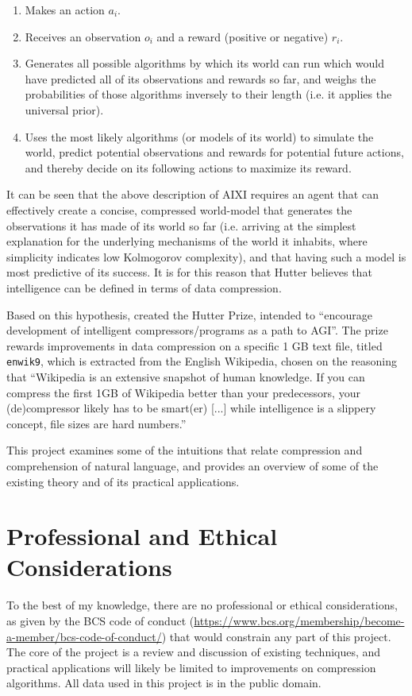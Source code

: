 \begin{enumerate}
    \item Makes an action $a_i$.
    \item Receives an observation $o_i$ and a reward (positive or negative) $r_i$.
    \item Generates all possible algorithms by which its world can run which would have predicted all of its observations and rewards so far, and weighs the probabilities of those algorithms inversely to their length (i.e. it applies the universal prior).
    \item Uses the most likely algorithms (or models of its world) to simulate the world, predict potential observations and rewards for potential future actions, and thereby decide on its following actions to maximize its reward.
\end{enumerate}

It can be seen that the above description of AIXI requires an agent that can effectively create a concise, compressed world-model that generates the observations it has made of its world so far (i.e. arriving at the simplest explanation for the underlying mechanisms of the world it inhabits, where simplicity indicates low Kolmogorov complexity), and that having such a model is most predictive of its success. It is for this reason that Hutter believes that intelligence can be defined in terms of data compression.

Based on this hypothesis, \textcite{Hutter2006} created the Hutter Prize, intended to “encourage development of intelligent compressors/programs as a path to AGI”. The prize rewards improvements in data compression on a specific 1 GB text file, titled \texttt{enwik9}, which is extracted from the English Wikipedia, chosen on the reasoning that “Wikipedia is an extensive snapshot of human knowledge. If you can compress the first 1GB of Wikipedia better than your predecessors, your (de)compressor likely has to be smart(er) [...] while intelligence is a slippery concept, file sizes are hard numbers.”

This project examines some of the intuitions that relate compression and comprehension of natural language, and provides an overview of some of the existing theory and of its practical applications.

\section{Professional and Ethical Considerations}
\label{subsec:bcs}
To the best of my knowledge, there are no professional or ethical considerations, as given by the BCS code of conduct (\url{https://www.bcs.org/membership/become-a-member/bcs-code-of-conduct/}) that would constrain any part of this project. The core of the project is a review and discussion of existing techniques, and practical applications will likely be limited to improvements on compression algorithms. All data used in this project is in the public domain.

